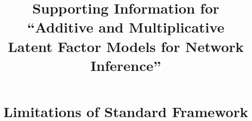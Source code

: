 \documentclass[12pt,pdflatex]{elsarticle}
\begin{document}
\thispagestyle{empty}
\begin{frontmatter}

\title{Supporting Information for ``Additive and Multiplicative Latent Factor Models for Network Inference''} %





\end{frontmatter}

\newpage\setcounter{page}{1}

\section*{Limitations of Standard Framework}
\end{document}
